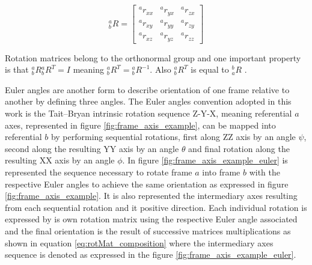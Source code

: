 \begin{equation}
{}^a_bR=\begin{bmatrix}
{}^ar_{xx} & {}^ar_{yx} & {}^ar_{zx}\\
{}^ar_{xy} & {}^ar_{yy} & {}^ar_{zy}\\
{}^ar_{xz} & {}^ar_{yz} & {}^ar_{zz}
\end{bmatrix}
\label{eq:rotation_matrix}
\end{equation}

Rotation matrices belong to the orthonormal group and one important property
is that ${}^a_bR{}^a_bR^T=I$ meaning ${}^a_bR^T = {}^a_bR^{-1}$. Also
${}^a_bR^T$ is equal to ${}^b_aR$
\cite{Sequeira2016}\cite{wiki_rotationtheorem}.


Euler angles are another form to describe orientation of one frame relative to
another by defining three angles. The Euler angles convention adopted in this
work is the Tait–Bryan \gls{intrinsic} rotation sequence Z-Y-X, meaning
referential $a$ axes, represented in figure \ref{fig:frame_axis_example}, can be
mapped into referential $b$ by performing sequential rotations, first along ZZ
axis by an angle $\psi$, second along the resulting YY axis by an angle $\theta$
and final rotation along the resulting XX axis by an angle $\phi$. In figure
\ref{fig:frame_axis_example_euler} is represented the sequence necessary to
rotate frame $a$ into frame $b$ with the respective Euler angles to achieve the
same orientation as expressed in figure \ref{fig:frame_axis_example}. It is also
represented the intermediary axes resulting from each sequential rotation and it
positive direction. Each individual rotation is expressed by is own rotation
matrix using the respective Euler angle associated and the final orientation is
the result of successive matrices multiplications as shown in equation
\ref{eq:rotMat_composition} where the intermediary axes sequence is denoted as
expressed in the figure \ref{fig:frame_axis_example_euler}.

